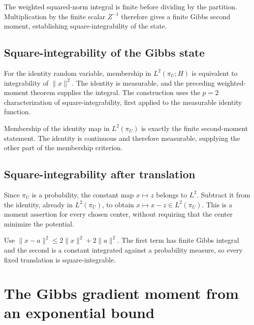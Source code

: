 \documentclass[11pt,a4paper]{report}
\begin{document}
The weighted squared-norm integral is finite before dividing by the partition. Multiplication by the finite scalar \(Z^{-1}\) therefore gives a finite Gibbs second moment, establishing square-integrability of the state.

\subsection{\texorpdfstring{Square-integrability of the Gibbs state}{Square-integrability of the Gibbs state}}
\label{report-step-UnadjustedLangevin-Gibbs-lean-15}


For the identity random variable, membership in \(L^2(\pi_U;H)\) is equivalent to integrability of \(\|x\|^2\). The identity is measurable, and the preceding weighted-moment theorem supplies the integral. The construction uses the \(p=2\) characterization of square-integrability, first applied to the measurable identity function.



Membership of the identity map in \(L^2(\pi_U)\) is exactly the finite second-moment statement. The identity is continuous and therefore measurable, supplying the other part of the membership criterion.

\subsection{\texorpdfstring{Square-integrability after translation}{Square-integrability after translation}}
\label{report-step-UnadjustedLangevin-Gibbs-lean-16}


Since \(\pi_U\) is a probability, the constant map \(x\mapsto z\) belongs to \(L^2\). Subtract it from the identity, already in \(L^2(\pi_U)\), to obtain \(x\mapsto x-z\in L^2(\pi_U)\). This is a moment assertion for every chosen center, without requiring that the center minimize the potential.



Use \(\|x-a\|^2\le2\|x\|^2+2\|a\|^2\). The first term has finite Gibbs integral and the second is a constant integrated against a probability measure, so every fixed translation is square-integrable.

\section{\texorpdfstring{The Gibbs gradient moment from an exponential bound}{The Gibbs gradient moment from an exponential bound}}
\label{proof-module-UnadjustedLangevin-GibbsScore-lean}
\end{document}
